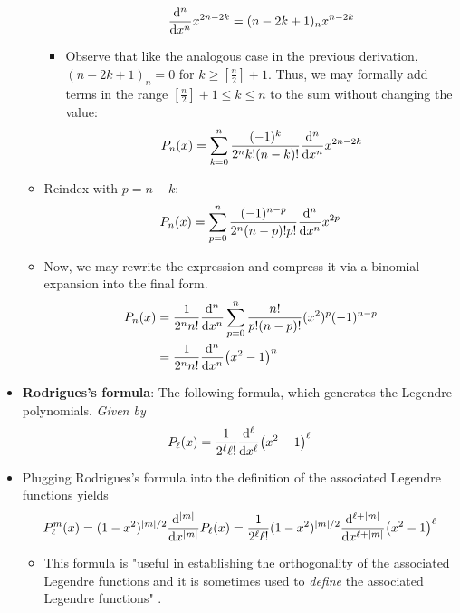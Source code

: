\documentclass[../finalProject.tex]{subfiles}
\begin{document}
\begin{itemize}
\begin{itemize}
\begin{itemize}
            \begin{equation*}
                \dv[n]{x}x^{2n-2k} = (n-2k+1)_nx^{n-2k}
            \end{equation*}
            \item Observe that like the analogous case in the previous derivation, $(n-2k+1)_n=0$ for $k\geq[\tfrac{n}{2}]+1$. Thus, we may formally add terms in the range $[\tfrac{n}{2}]+1\leq k\leq n$ to the sum without changing the value:
            \begin{equation*}
                P_n(x) = \sum_{k=0}^n\frac{(-1)^k}{2^nk!(n-k)!}\dv[n]{x}x^{2n-2k}
            \end{equation*}
        \end{itemize}
        \item Reindex with $p=n-k$:
        \begin{equation*}
            P_n(x) = \sum_{p=0}^n\frac{(-1)^{n-p}}{2^n(n-p)!p!}\dv[n]{x}x^{2p}
        \end{equation*}
        \item Now, we may rewrite the expression and compress it via a binomial expansion into the final form.
        \begin{align*}
            P_n(x) &= \frac{1}{2^nn!}\dv[n]{x}\sum_{p=0}^n\frac{n!}{p!(n-p)!}(x^2)^p(-1)^{n-p}\\
            &= \frac{1}{2^nn!}\dv[n]{x}(x^2-1)^n
        \end{align*}
    \end{itemize}
    \item \textbf{Rodrigues's formula}: The following formula, which generates the Legendre polynomials. \emph{Given by}
    \begin{equation*}
        P_\ell(x) = \frac{1}{2^\ell\ell!}\dv[\ell]{x}(x^2-1)^\ell
    \end{equation*}
    \item Plugging Rodrigues's formula into the definition of the associated Legendre functions yields
    \begin{equation*}
        P_\ell^m(x) = (1-x^2)^{|m|/2}\dv[|m|]{x}P_\ell(x)
        = \frac{1}{2^\ell\ell!}(1-x^2)^{|m|/2}\dv[\ell+|m|]{x}(x^2-1)^\ell
    \end{equation*}
    \begin{itemize}
        \item This formula is "useful in establishing the orthogonality of the associated Legendre functions and it is sometimes used to \emph{define} the associated Legendre functions" \parencite[165]{bib:Seaborn}.
    \end{itemize}
\end{itemize}
\end{document}
